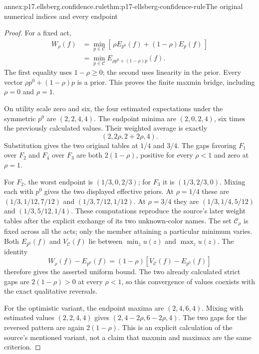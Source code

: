 \begin{annexitem}{annex:p17.ellsberg.confidence.rule}{thm:p17-ellsberg-confidence-rule}{The original numerical indices and every endpoint}
\begin{proof}
For a fixed act,
\[
\begin{split}
 W_\rho(f)
 &=\min_{p\in\mathcal C}
             [\,\rho E_{p^0}(f)+(1-\rho)E_p(f)\,]\\
 &=\min_{p\in\mathcal C}
                    E_{\rho p^0+(1-\rho)p}(f).
\end{split}
\]
The first equality uses \(1-\rho\geq0\);
the second uses linearity in the prior.
Every vector \(\rho p^0+(1-\rho)p\)
is a prior. This proves the finite
maxmin bridge, including \(\rho=0\)
and \(\rho=1\).

On utility scale zero and six,
the four estimated expectations
under the symmetric \(p^0\) are
\((2,2,4,4)\). The endpoint minima
are \((2,0,2,4)\), six times
the previously calculated values.
Their weighted average is exactly
\[
                         (2,2\rho,2+2\rho,4).
\]
Substitution gives the two original
tables at \(1/4\) and \(3/4\).
The gaps favoring \(F_1\) over
\(F_2\) and \(F_4\) over \(F_3\)
are both \(2(1-\rho)\), positive
for every \(\rho<1\) and zero
at \(\rho=1\).

For \(F_2\), the worst endpoint
is \((1/3,0,2/3)\); for \(F_3\)
it is \((1/3,2/3,0)\).
Mixing each with \(p^0\) gives
the two displayed effective priors.
At \(\rho=1/4\) these are
\((1/3,1/12,7/12)\) and
\((1/3,7/12,1/12)\).
At \(\rho=3/4\) they are
\((1/3,1/4,5/12)\) and
\((1/3,5/12,1/4)\).
These computations reproduce the
source's later weight tables
after the explicit exchange of
its two unknown-color names.
The set \(\mathcal C_\rho\)
is fixed across all the acts;
only the member attaining a
particular minimum varies.
Both \(E_{p^0}(f)\) and \(V_{\mathcal C}(f)\)
lie between \(\min_z u(z)\) and \(\max_z u(z)\).
The identity
\[
 W_\rho(f)-E_{p^0}(f)
        =(1-\rho)[V_{\mathcal C}(f)-E_{p^0}(f)]
\]
therefore gives the asserted uniform bound.
The two already calculated strict gaps are
\(2(1-\rho)>0\) at every \(\rho<1\), so
this convergence of values coexists with
the exact qualitative reversals.

For the optimistic variant, the
endpoint maxima are \((2,4,6,4)\).
Mixing with estimated values
\((2,2,4,4)\) gives
\((2,4-2\rho,6-2\rho,4)\).
The two gaps for the reversed
pattern are again \(2(1-\rho)\).
This is an explicit calculation
of the source's mentioned variant,
not a claim that maxmin and
maximax are the same criterion.


\end{proof}
\end{annexitem}
